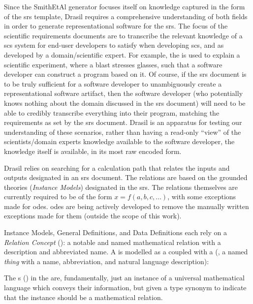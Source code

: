 Since the SmithEtAl generator focuses itself on knowledge captured in the form
of the \acs{srs} template, Drasil requires a comprehensive understanding of both
fields in order to generate representational software for the \acs{srs}. The
focus of the scientific requirements documents are to transcribe the relevant
knowledge of a \acs{scs} system for end-user developers to satisfy when
developing \acs{scs}, and as developed by a domain/scientific expert. For
example, the 
is used to explain a scientific experiment, where a blast stresses glasses, such
that a software developer can construct a program based on it. Of course, if the
\acs{srs} document is to be truly sufficient for a software developer to
unambiguously create a representational software artifact, then the software
developer (who potentially knows nothing about the domain discussed in the
\acs{srs} document) will need to be able to credibly transcribe everything into
their program, matching the requirements as set by the \acs{srs} document.
Drasil is an apparatus for testing our understanding of these scenarios, rather
than having a read-only ``view'' of the scientists/domain experts knowledge
available to the software developer, the knowledge itself is available, in its
most raw encoded form.

Drasil relies on searching for a calculation path that relates the inputs and
outputs designated in an \acs{srs} document. The relations are based on the
grounded theories (\textit{Instance Models}) designated in the \acs{srs}. The
relations themselves are currently required to be of the form \(x = f(a, b, c,
\ldots{})\), with some exceptions made for \acsp{ode}. \acsp{ode} are being
actively developed to remove the manually written exceptions made for them
(outside the scope of this work).

Instance Models, General Definitions, and Data Definitions each rely on a
\textit{Relation Concept} (\RelationConcept{}): a notable and named mathematical
relation with a description and abbreviated name. A \RelationConcept{} is
modelled as a \Relation{} coupled with a \ConceptChunk{}
(, a named \textit{thing} with a name,
abbreviation, and natural language description):

\originalRelationConcept{}

The \Relation{}s () in the \RelationConcept{} are,
fundamentally, just an instance of a universal mathematical language which
conveys their information, but given a type synonym to indicate that the
instance should be a mathematical relation.

